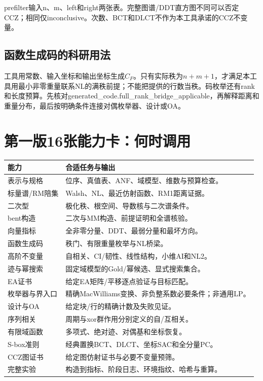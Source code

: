 \documentclass[UTF8,fontset=fandol,zihao=-4]{ctexrep}
\begin{document}
prefilter输入n、m、left和right两张表。完整图谱/DDT直方图不同可以否定CCZ；相同仅inconclusive。次数、BCT和DLCT不作为本工具承诺的CCZ不变量。

\section{函数生成码的科研用法}
工具用常数、输入坐标和输出坐标生成$C_F$。只有实际秩为$n+m+1$，才满足本工具用最小非零重量联系NL的满秩前提；不能把提供的行数当秩。码枚举还有rank和长度预算。先核对generated\_code.full\_rank\_bridge\_applicable，再解释距离和重量分布，最后按明确条件连接对偶枚举器、设计或OA。

\chapter{第一版16张能力卡：何时调用}
\small\begin{longtable}{p{37mm}p{108mm}}
\toprule 能力 & 合适任务与输出\\\midrule\endhead
表示与规格 & 位序、真值表、ANF、域模型、维数与预算检查。\\
标量谱/RM陪集 & Walsh、NL、最近仿射函数、RM1距离证据。\\
二次型 & 极化秩、根空间、导数核与二次谱条件。\\
bent构造 & 二次与MM构造、前提证明和全谱核验。\\
向量指标 & 全非零分量、DDT、最弱分量和最坏方向。\\
函数生成码 & 秩门、有限重量枚举与NL桥梁。\\
高阶不变量 & 自相关、CI/韧性、线性结构，小维AI和NL2。\\
迹与幂搜索 & 固定域模型的Gold/幂候选、显式搜索集合。\\
EA证书 & 给定EA矩阵/平移逐点验证与目标匹配。\\
枚举器与界入口 & 精确MacWilliams变换、非负整系数必要条件；非通用LP。\\
设计与OA & 给定块/行的精确计数及失败见证。\\
序列相关 & 周期与xor群作用分别定义的自/互相关。\\
有限域函数 & 多项式、绝对迹、对偶基和坐标恢复。\\
S-box准则 & 经典置换BCT、DLCT、坐标SAC和全分量PC。\\
CCZ图证书 & 给定图仿射证书与必要不变量预筛。\\
完整实验 & 构造到指标、阶段日志、环境指纹、哈希与重算。\\\bottomrule
\end{longtable}\normalsize
\end{document}

